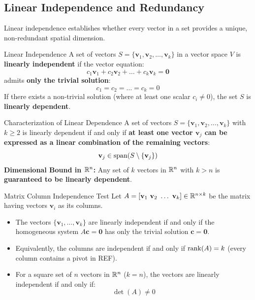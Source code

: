 \subsection{Linear Independence and Redundancy}

Linear independence establishes whether every vector in a set provides a unique, non-redundant spatial dimension.

\begin{definitionbox}{Linear Independence}
A set of vectors $S = \{\mathbf{v}_1, \mathbf{v}_2, \dots, \mathbf{v}_k\}$ in a vector space $V$ is \textbf{linearly independent} if the vector equation:
\begin{equation}
c_1 \mathbf{v}_1 + c_2 \mathbf{v}_2 + \dots + c_k \mathbf{v}_k = \mathbf{0}
\end{equation}
admits \textbf{only the trivial solution}:
\begin{equation}
c_1 = c_2 = \dots = c_k = 0
\end{equation}
If there exists a non-trivial solution (where at least one scalar $c_i \neq 0$), the set $S$ is \textbf{linearly dependent}.
\end{definitionbox}

\begin{theorembox}{Characterization of Linear Dependence}
A set of vectors $S = \{\mathbf{v}_1, \mathbf{v}_2, \dots, \mathbf{v}_k\}$ with $k \ge 2$ is linearly dependent if and only if \textbf{at least one vector $\mathbf{v}_j$ can be expressed as a linear combination of the remaining vectors}:
\begin{equation}
\mathbf{v}_j \in \operatorname{span}(S \setminus \{\mathbf{v}_j\})
\end{equation}
\textbf{Dimensional Bound in $\mathbb{R}^n$:} Any set of $k$ vectors in $\mathbb{R}^n$ with $k > n$ is \textbf{guaranteed to be linearly dependent}.
\end{theorembox}

\begin{theorembox}{Matrix Column Independence Test}
Let $A = [\mathbf{v}_1 \ \mathbf{v}_2 \ \dots \ \mathbf{v}_k] \in \R^{n \times k}$ be the matrix having vectors $\mathbf{v}_i$ as its columns.
\begin{itemize}
    \item The vectors $\{\mathbf{v}_1, \dots, \mathbf{v}_k\}$ are linearly independent if and only if the homogeneous system $A\mathbf{c} = \mathbf{0}$ has only the trivial solution $\mathbf{c} = \mathbf{0}$.
    \item Equivalently, the columns are independent if and only if $\operatorname{rank}(A) = k$ (every column contains a pivot in REF).
    \item For a square set of $n$ vectors in $\mathbb{R}^n$ ($k = n$), the vectors are linearly independent if and only if:
    \begin{equation}
    \det(A) \neq 0
    \end{equation}
\end{itemize}
\end{theorembox}

